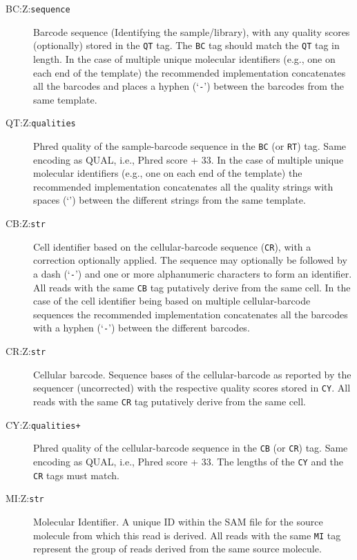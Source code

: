 \documentclass[10pt]{article}
\newcommand{\tagvalue}[1]{\tt #1}
\begin{document}
\begin{description}
\item[BC:Z:\tagvalue{sequence}]
Barcode sequence (Identifying the sample/library), with any quality scores (optionally) stored in the {\tt QT} tag.
The {\tt BC} tag should match the {\tt QT} tag in length. 
In the case of multiple unique molecular identifiers (e.g., one on each end of the template) the recommended implementation concatenates all the barcodes and places a hyphen (`{\tt -}') between the barcodes from the same template. 

\item[QT:Z:\tagvalue{qualities}] 
Phred quality of the sample-barcode sequence in the {\tt BC} (or {\tt RT}) tag. 
Same encoding as {\sf QUAL}, i.e., Phred score + 33.
In the case of multiple unique molecular identifiers (e.g., one on each end of the template) the recommended implementation concatenates all the quality strings with spaces (`{\tt \textvisiblespace}') between the different strings from the same template. 

\item[CB:Z:\tagvalue{str}]
Cell identifier based on the cellular-barcode sequence ({\tt CR}), with a correction optionally applied. The sequence may optionally be followed by a dash (`{\tt -}') and one or more alphanumeric characters to form an identifier. All reads with the same {\tt CB} tag putatively derive from the same cell.
In the case of the cell identifier being based on multiple cellular-barcode sequences the recommended implementation concatenates all the barcodes with a hyphen (`{\tt -}') between the different barcodes.

\item[CR:Z:\tagvalue{str}]
Cellular barcode. Sequence bases of the cellular-barcode as reported by the sequencer (uncorrected) with the respective quality scores stored in {\tt CY}. All reads with the same {\tt CR} tag putatively derive from the same cell. 

\item[CY:Z:\tagvalue{qualities+}] 
Phred quality of the cellular-barcode sequence in the {\tt CB} (or {\tt CR}) tag. 
Same encoding as {\sf QUAL}, i.e., Phred score + 33.
The lengths of the {\tt CY} and the {\tt CR} tags must match. 
  
\item[MI:Z:\tagvalue{str}]
Molecular Identifier. 
A unique ID within the SAM file for the source molecule from which this read is derived. 
All reads with the same {\tt MI} tag represent the group of reads derived from the same source molecule. 


\end{description}
\end{document}
